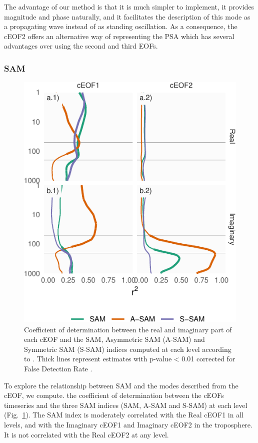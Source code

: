 \documentclass[smallextended]{svjour3}       %
\begin{document}
The advantage of our method is that it is much simpler to implement, it provides magnitude and phase naturally, and it facilitates the description of this mode as a propagating wave instead of as standing oscillation. As a consequence, the cEOF2 offers an alternative way of representing the PSA which has several advantages over using the second and third EOFs.

\hypertarget{sam}{%
\subsubsection{SAM}\label{sam}}



\begin{figure}
\centering
\includegraphics{../figures/sam-eof-vertical-1.pdf}
\caption{\label{fig:sam-eof-vertical}Coefficient of determination between the real and imaginary part of each cEOF and the SAM, Asymmetric SAM (A-SAM) and Symmetric SAM (S-SAM) indices computed at each level according to \citet{campitelli2021}. Thick lines represent estimates with p-value \textless{} 0.01 corrected for False Detection Rate \citep{benjamini1995}.}
\end{figure}

To explore the relationship between SAM and the modes described from the cEOF, we compute. the coefficient of determination between the cEOFs timeseries and the three SAM indices (SAM, A-SAM and S-SAM) at each level (Fig.~\ref{fig:sam-eof-vertical}). The SAM index is moderately correlated with the Real cEOF1 in all levels, and with the Imaginary cEOF1 and Imaginary cEOF2 in the troposphere. It is not correlated with the Real cEOF2 at any level.
\end{document}
